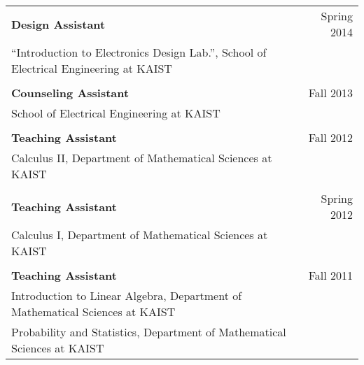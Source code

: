 \documentclass[11pt,a4paper]{article}
\begin{document}
\begin{tabular}{p{14cm}r}
\textbf{Design Assistant} & Spring 2014 \\
``Introduction to Electronics Design Lab.'', School of Electrical Engineering at KAIST & \\
\\
\textbf{Counseling Assistant} & Fall 2013 \\
School of Electrical Engineering at KAIST & \\
\\
\textbf{Teaching Assistant} & Fall 2012 \\
Calculus II, Department of Mathematical Sciences at KAIST & \\
\\
\textbf{Teaching Assistant} & Spring 2012 \\
Calculus I, Department of Mathematical Sciences at KAIST & \\
\\
\textbf{Teaching Assistant} & Fall 2011 \\
Introduction to Linear Algebra, Department of Mathematical Sciences at KAIST & \\
Probability and Statistics, Department of Mathematical Sciences at KAIST & \\
\end{tabular}
\end{document}
